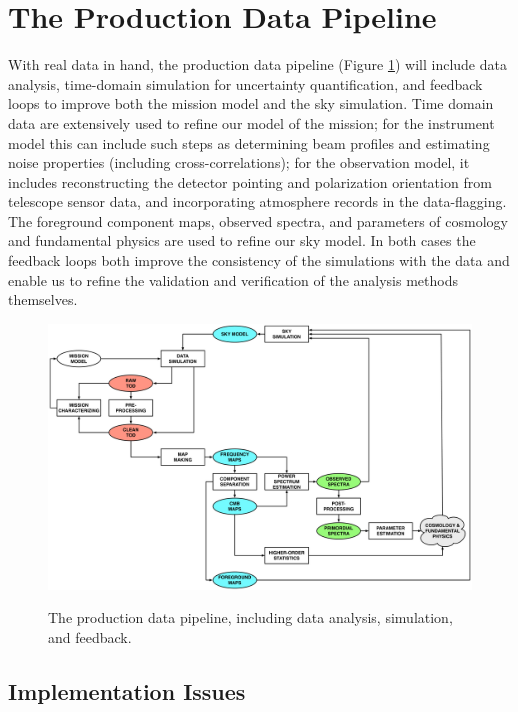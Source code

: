  
\section{The Production Data Pipeline}

With real data in hand, the production data pipeline (Figure \ref{fig_prod}) will include data analysis, time-domain simulation for uncertainty quantification, and feedback loops to improve both the mission model and the sky simulation. Time domain data are extensively used to refine our model of the mission; for the instrument model this can include such steps as determining beam profiles and estimating noise properties (including cross-correlations); for the observation model, it includes reconstructing the detector pointing and polarization orientation from telescope sensor data, and incorporating atmosphere records in the data-flagging. The foreground component maps, observed spectra, and parameters of cosmology and fundamental physics are used to refine our sky model. In both cases the feedback loops both improve the consistency of the simulations with the data and enable us to refine the validation and verification of the analysis methods themselves.

\begin{figure}[htbp]
\includegraphics[width=1.0\textwidth]{Analysis/production}\\
\caption{The production data pipeline, including data analysis, simulation, and feedback.}
\label{fig_prod}
\end{figure}

\subsection{Implementation Issues}

